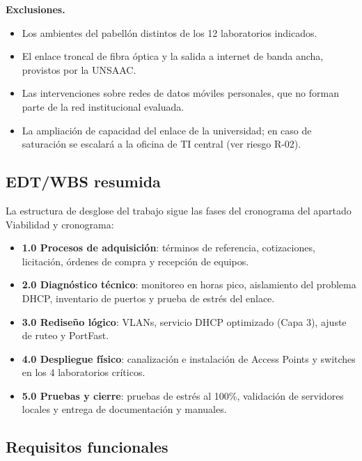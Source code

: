 	\textbf{Exclusiones.}

	\begin{itemize}
		\item Los ambientes del pabellón distintos de los 12 laboratorios indicados.
		\item El enlace troncal de fibra óptica y la salida a internet de banda ancha, provistos por la UNSAAC.
		\item Las intervenciones sobre redes de datos móviles personales, que no forman parte de la red institucional evaluada.
		\item La ampliación de capacidad del enlace de la universidad; en caso de saturación se escalará a la oficina de TI central (ver riesgo R-02).
	\end{itemize}

\subsection{EDT/WBS resumida}

	La estructura de desglose del trabajo sigue las fases del cronograma del apartado Viabilidad y cronograma:

	\begin{itemize}
		\item \textbf{1.0 Procesos de adquisición}: términos de referencia, cotizaciones, licitación, órdenes de compra y recepción de equipos.
		\item \textbf{2.0 Diagnóstico técnico}: monitoreo en horas pico, aislamiento del problema DHCP, inventario de puertos y prueba de estrés del enlace.
		\item \textbf{3.0 Rediseño lógico}: VLANs, servicio DHCP optimizado (Capa 3), ajuste de ruteo y PortFast.
		\item \textbf{4.0 Despliegue físico}: canalización e instalación de Access Points y switches en los 4 laboratorios críticos.
		\item \textbf{5.0 Pruebas y cierre}: pruebas de estrés al 100\%, validación de servidores locales y entrega de documentación y manuales.
	\end{itemize}

\subsection{Requisitos funcionales}

